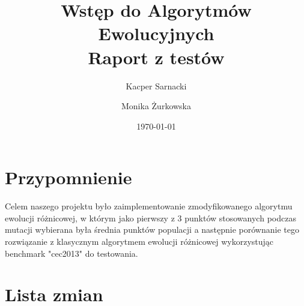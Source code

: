\documentclass[a4paper]{article}
\title{Wstęp do Algorytmów Ewolucyjnych \\
	\large Raport z testów}
\date{\today}
\author{Kacper Sarnacki \and Monika Żurkowska}
\begin{document}
\maketitle

\section {Przypomnienie}
Celem naszego projektu było zaimplementowanie zmodyfikowanego algorytmu ewolucji różnicowej, w którym jako pierwszy z 3 punktów stosowanych podczas mutacji wybierana była średnia punktów populacji a następnie porównanie tego rozwiązanie z klasycznym algorytmem ewolucji różnicowej wykorzystując benchmark "cec2013" do testowania.


\section{Lista zmian}
\end{document}
